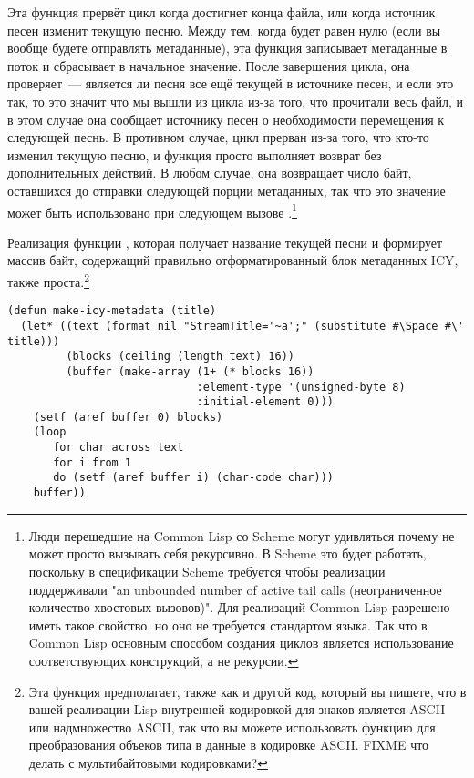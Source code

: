 Эта функция прервёт цикл когда достигнет конца файла, или когда источник песен изменит
текущую песню.  Между тем, когда  будет равен нулю (если вы вообще
будете отправлять метаданные), эта функция записывает метаданные в поток и сбрасывает
 в начальное значение.  После завершения цикла, она проверяет~---
является ли песня все ещё текущей в источнике песен, и если это так, то это значит что мы
вышли из цикла из-за того, что прочитали весь файл, и в этом случае она сообщает источнику
песен о необходимости перемещения к следующей песнь.  В противном случае, цикл прерван
из-за того, что кто-то изменил текущую песню, и функция просто выполняет возврат без
дополнительных действий.  В любом случае, она возвращает число байт, оставшихся до
отправки следующей порции метаданных, так что это значение может быть использовано при
следующем вызове .\footnote{Люди перешедшие на Common Lisp со Scheme
  могут удивляться почему  не может просто вызывать себя рекурсивно.  В
  Scheme это будет работать, поскольку в спецификации Scheme требуется чтобы реализации
  поддерживали "an unbounded number of active tail calls (неограниченное количество
  хвостовых вызовов)".  Для реализаций Common Lisp разрешено иметь такое свойство, но оно
  не требуется стандартом языка.  Так что в Common Lisp основным способом создания циклов
  является использование соответствующих конструкций, а не рекурсии.}

Реализация функции , которая получает название текущей песни и
формирует массив байт, содержащий правильно отформатированный блок метаданных ICY, также
проста.\footnote{Эта функция предполагает, также как и другой код, который вы пишете, что
  в вашей реализации Lisp внутренней кодировкой для знаков является ASCII или надмножество
  ASCII, так что вы можете использовать функцию  для преобразования
  объеков типа  в данные в кодировке ASCII. FIXME что делать с
  мультибайтовыми кодировками?}

\begin{lstlisting}
(defun make-icy-metadata (title)
  (let* ((text (format nil "StreamTitle='~a';" (substitute #\Space #\' title)))
         (blocks (ceiling (length text) 16))
         (buffer (make-array (1+ (* blocks 16))
                             :element-type '(unsigned-byte 8)
                             :initial-element 0)))
    (setf (aref buffer 0) blocks)
    (loop 
       for char across text
       for i from 1 
       do (setf (aref buffer i) (char-code char)))
    buffer))
\end{lstlisting}

